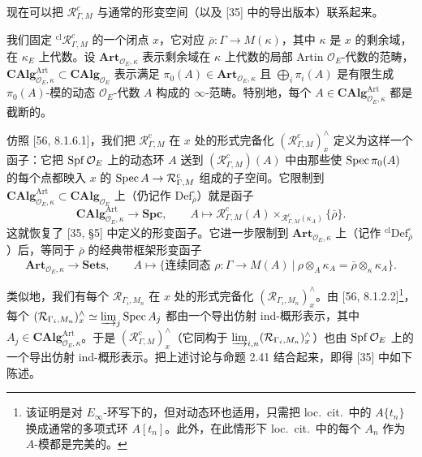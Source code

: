 现在可以把 $\mathcal R^c_{\Gamma,M}$ 与通常的形变空间（以及 [35] 中的导出版本）联系起来。

我们固定 ${}^{\mathrm{cl}}\mathcal R^c_{\Gamma,M}$ 的一个闭点 $x$，它对应 $\bar\rho\colon \Gamma \to M(\kappa)$，其中 $\kappa$ 是 $x$ 的剩余域，在 $\kappa_E$ 上代数。设 $\mathbf{Art}_{\mathcal O_E,\kappa}$ 表示剩余域在 $\kappa$ 上代数的局部 Artin $\mathcal O_E$-代数的范畴，$\mathbf{CAlg}^{\mathrm{Art}}_{\mathcal O_E,\kappa} \subset \mathbf{CAlg}_{\mathcal O_E}$ 表示满足 $\pi_0(A) \in \mathbf{Art}_{\mathcal O_E,\kappa}$ 且 $\bigoplus_i \pi_i(A)$ 是有限生成 $\pi_0(A)$-模的动态 $\mathcal O_E$-代数 $A$ 构成的 $\infty$-范畴。特别地，每个 $A \in \mathbf{CAlg}^{\mathrm{Art}}_{\mathcal O_E,\kappa}$ 都是截断的。

仿照 [56, 8.1.6.1]，我们把 $\mathcal R^c_{\Gamma,M}$ 在 $x$ 处的形式完备化 $(\mathcal R^c_{\Gamma,M})^\wedge_x$ 定义为这样一个函子：它把 $\operatorname{Spf}\mathcal O_E$ 上的动态环 $A$ 送到 $(\mathcal R^c_{\Gamma,M})(A)$ 中由那些使 $\operatorname{Spec}\pi_0(A)$ 的每个点都映入 $x$ 的 $\operatorname{Spec} A \to \mathcal R^c_{\Gamma,M}$ 组成的子空间。它限制到 $\mathbf{CAlg}^{\mathrm{Art}}_{\mathcal O_E,\kappa} \subset \mathbf{CAlg}_{\mathcal O_E}$ 上（仍记作 $\mathrm{Def}^\square_{\bar\rho}$）就是函子
\[
\mathbf{CAlg}^{\mathrm{Art}}_{\mathcal O_E,\kappa} \to \mathbf{Spc},\qquad
A \mapsto \mathcal R^c_{\Gamma,M}(A)\times_{\mathcal R^c_{\Gamma,M}(\kappa_A)}\{\bar\rho\}.
\]
这就恢复了 [35, §5] 中定义的形变函子。它进一步限制到 $\mathbf{Art}_{\mathcal O_E,\kappa}$ 上（记作 ${}^{\mathrm{cl}}\mathrm{Def}^\square_{\bar\rho}$）后，等同于 $\bar\rho$ 的经典带框架形变函子
\[
\mathbf{Art}_{\mathcal O_E,\kappa} \to \mathbf{Sets},\qquad
A \mapsto \bigl\{\text{连续同态 } \rho\colon \Gamma \to M(A) \ \big|\ \rho\otimes_A\kappa_A = \bar\rho\otimes_\kappa\kappa_A\bigr\}.
\]

类似地，我们有每个 $\mathcal R_{\Gamma_i,M_n}$ 在 $x$ 处的形式完备化 $(\mathcal R_{\Gamma_i,M_n})^\wedge_x$。由 [56, 8.1.2.2]\footnote{该证明是对 $E_\infty$-环写下的，但对动态环也适用，只需把 loc.\ cit.\ 中的 $A\{t_n\}$ 换成通常的多项式环 $A[t_n]$。此外，在此情形下 loc.\ cit.\ 中的每个 $A_n$ 作为 $A$-模都是完美的。}，每个 $(\mathcal R_{\Gamma_i,M_n})^\wedge_x \simeq \varinjlim_j \operatorname{Spec} A_j$ 都由一个导出仿射 ind-概形表示，其中 $A_j \in \mathbf{CAlg}^{\mathrm{Art}}_{\mathcal O_E,\kappa}$。于是 $(\mathcal R^c_{\Gamma,M})^\wedge_x$（它同构于 $\varinjlim_{i,n}(\mathcal R_{\Gamma_i,M_n})^\wedge_x$）也由 $\operatorname{Spf}\mathcal O_E$ 上的一个导出仿射 ind-概形表示。把上述讨论与命题 2.41 结合起来，即得 [35] 中如下陈述。


